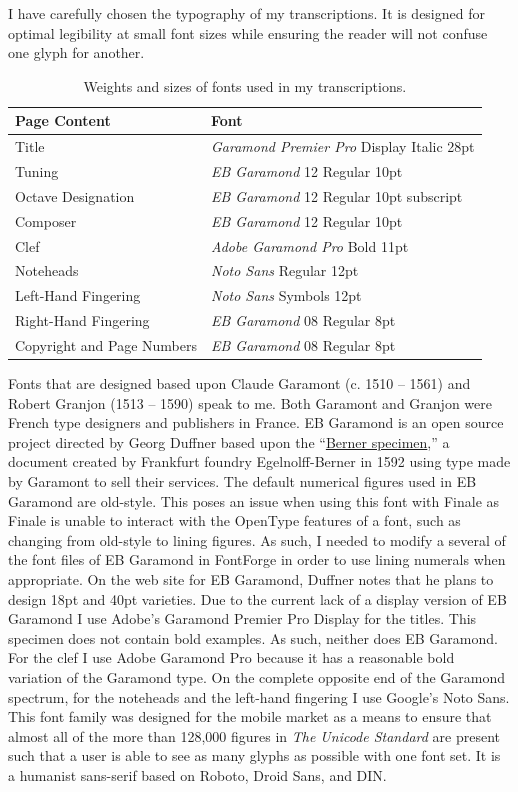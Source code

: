 \documentclass[unicode,hyperfootnotes=false,xetex,colorlinks=true,nofonts,nobib]{tufte-handout}
\newcommand{\textls}[2][5]{%
    \begingroup\addfontfeatures{LetterSpace=#1}#2\endgroup
  }
\renewcommand{\smallcapsspacing}[1]{\textls[10]{#1}}
\renewcommand{\textsc}[1]{\smallcapsspacing{\textsmallcaps{#1}}}
\renewcommand{\cite}[2][0pt]{%
  \sidenote[][#1]{\fullcite{#2}.}%
  }
\begin{document}
I have carefully chosen the typography of my transcriptions. It is designed for optimal legibility at small font sizes while ensuring the reader will not confuse one glyph for another.
  \begin{table}\centering
    \small
    \begin{tabular}{l l}\toprule
      Page Content  & Font \\\midrule
      Title & \emph{Garamond Premier Pro} Display Italic 28pt\\
      Tuning & \emph{EB Garamond} 12 Regular 10pt\\
      Octave Designation & \emph{EB Garamond} 12 Regular 10pt subscript\\
      Composer & \emph{EB Garamond} 12 Regular 10pt\\
      Clef & \emph{Adobe Garamond Pro} Bold 11pt\\
      Noteheads & \emph{Noto Sans} Regular 12pt\\
      Left-Hand Fingering & \emph{Noto Sans} Symbols 12pt\\
      Right-Hand Fingering & \emph{EB Garamond} 08 Regular 8pt\\
      Copyright and Page Numbers & \emph{EB Garamond} 08 Regular 8pt\\
      \bottomrule
  \end{tabular}
    \caption{Weights and sizes of fonts used in my transcriptions.}
\end{table}
Fonts that are designed based upon Claude Garamont (c. 1510 -- 1561) and Robert Granjon (1513 -- 1590) speak to me. Both Garamont and Granjon were French type designers and publishers in France. EB Garamond is an open source project directed by Georg Duffner based upon the ``\href{run:specimen.pdf}{Berner specimen},'' a document created by Frankfurt foundry Egelnolff-Berner in 1592 using type made by Garamont to sell their services.  The default numerical figures used in EB Garamond are old-style. This poses an issue when using this font with Finale as Finale is unable to interact with the OpenType features of a font, such as changing from old-style to lining figures. As such, I needed to modify a several of the font files of EB Garamond in FontForge in order to use lining numerals when appropriate. On the web site for EB Garamond, Duffner notes that he plans to design 18pt and 40pt varieties.\cite{duffner} Due to the current lack of a display version of EB Garamond I use Adobe's Garamond Premier Pro Display for the titles. This specimen does not contain bold examples. As such, neither does EB Garamond. For the \textsc{tab} clef I use Adobe Garamond Pro because it has a reasonable bold variation of the Garamond type. On the complete opposite end of the Garamond spectrum, for the noteheads and the left-hand fingering I use Google's Noto Sans. This font family was designed for the mobile market as a means to ensure that almost all of the more than 128,000 figures in \emph{The Unicode Standard} are present such that a user is able to see as many glyphs as possible with one font set. It is a humanist sans-serif based on Roboto, Droid Sans, and DIN.
\end{document}
